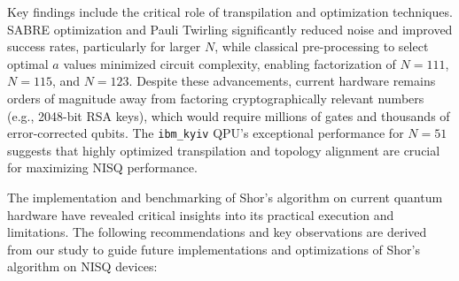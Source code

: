 \documentclass[conference,twoside]{IEEEtran}
\begin{document}
Key findings include the critical role of transpilation and optimization techniques. SABRE optimization and Pauli Twirling significantly reduced noise and improved success rates, particularly for larger $N$, while classical pre-processing to select optimal $a$ values minimized circuit complexity, enabling factorization of $N=111$, $N=115$, and $N=123$. Despite these advancements, current hardware remains orders of magnitude away from factoring cryptographically relevant numbers (e.g., 2048-bit RSA keys), which would require millions of gates and thousands of error-corrected qubits. The \texttt{ibm\_kyiv} QPU's exceptional performance for $N=51$ suggests that highly optimized transpilation and topology alignment are crucial for maximizing NISQ performance.

The implementation and benchmarking of Shor's algorithm on current quantum hardware have revealed critical insights into its practical execution and limitations. The following recommendations and key observations are derived from our study to guide future implementations and optimizations of Shor's algorithm on NISQ devices:
\end{document}
